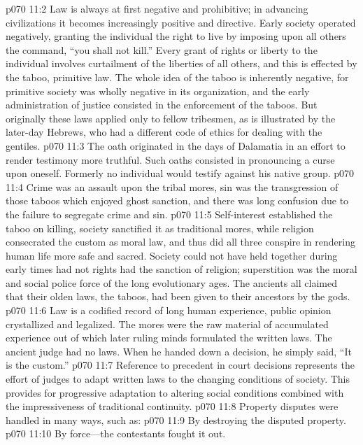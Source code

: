 \vs p070 11:2 Law is always at first negative and prohibitive; in advancing civilizations it becomes increasingly positive and directive. Early society operated negatively, granting the individual the right to live by imposing upon all others the command, “you shall not kill.” Every grant of rights or liberty to the individual involves curtailment of the liberties of all others, and this is effected by the taboo, primitive law. The whole idea of the taboo is inherently negative, for primitive society was wholly negative in its organization, and the early administration of justice consisted in the enforcement of the taboos. But originally these laws applied only to fellow tribesmen, as is illustrated by the later\hyp{}day Hebrews, who had a different code of ethics for dealing with the gentiles.
\vs p070 11:3 The oath originated in the days of Dalamatia in an effort to render testimony more truthful. Such oaths consisted in pronouncing a curse upon oneself. Formerly no individual would testify against his native group.
\pc \vs p070 11:4 Crime was an assault upon the tribal mores, sin was the transgression of those taboos which enjoyed ghost sanction, and there was long confusion due to the failure to segregate crime and sin.
\vs p070 11:5 Self\hyp{}interest established the taboo on killing, society sanctified it as traditional mores, while religion consecrated the custom as moral law, and thus did all three conspire in rendering human life more safe and sacred. Society could not have held together during early times had not rights had the sanction of religion; superstition was the moral and social police force of the long evolutionary ages. The ancients all claimed that their olden laws, the taboos, had been given to their ancestors by the gods.
\vs p070 11:6 Law is a codified record of long human experience, public opinion crystallized and legalized. The mores were the raw material of accumulated experience out of which later ruling minds formulated the written laws. The ancient judge had no laws. When he handed down a decision, he simply said, “It is the custom.”
\vs p070 11:7 Reference to precedent in court decisions represents the effort of judges to adapt written laws to the changing conditions of society. This provides for progressive adaptation to altering social conditions combined with the impressiveness of traditional continuity.
\pc \vs p070 11:8 Property disputes were handled in many ways, such as:
\pc \vs p070 11:9 \bibnobreakspace By destroying the disputed property.
\vs p070 11:10 \bibnobreakspace By force---the contestants fought it out.
